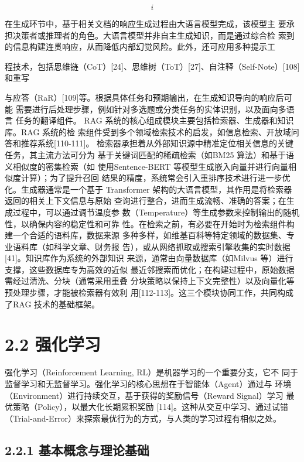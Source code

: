 \documentclass[12pt,a4paper,openright,UTF8]{ctexbook}
\begin{document}
\begin{equation*}
i
\end{equation*}

在生成环节中，基于相关文档的响应生成过程由大语言模型完成，该模型主 要承担决策者或推理者的角色。大语言模型并非自主生成知识，而是通过综合检 索到的信息构建连贯响应，从而降低内部幻觉风险。此外，还可应用多种提示工

程技术，包括思维链（CoT）[24]、思维树（ToT）[27]、自注释（Self-Note）[108]和重写

与应答（RaR）[109]等。根据具体任务和预期输出，在生成知识导向的响应后可能 需要进行后处理步骤，例如针对多选题或分类任务的实体识别，以及面向多语言 任务的翻译组件。 RAG 系统的核心组成模块主要包括检索器、生成器和知识库。RAG 系统的检 索组件受到多个领域检索技术的启发，如信息检索、开放域问答和推荐系统[110-111]。 检索器承担着从外部知识源中精准定位相关信息的关键任务，其主流方法可分为 基于关键词匹配的稀疏检索（如BM25 算法）和基于语义相似度的密集检索（如 使用Sentence-BERT 等模型生成嵌入向量并进行向量相似度计算）；为了提升召回 结果的精度，系统常会引入重排序技术进行进一步优化。生成器通常是一个基于 Transformer 架构的大语言模型，其作用是将检索器返回的相关上下文信息与原始 查询进行整合，进而生成流畅、准确的答案；在生成过程中，可以通过调节温度参 数（Temperature）等生成参数来控制输出的随机性，以确保内容的稳定性和可靠 性。在检索之前，有必要在开始时为检索组件构建一个合适的语料库，数据来源 多种多样，如维基百科等特定领域的数据集、专业语料库（如科学文章、财务报 告），或从网络抓取或搜索引擎收集的实时数据[41]。知识库作为系统的外部知识 来源，通常由向量数据库（如Milvus 等）进行支撑，这些数据库专为高效的近似 最近邻搜索而优化；在构建过程中，原始数据需经过清洗、分块（通常采用重叠 分块策略以保持上下文完整性）以及向量化等预处理步骤，才能被检索器有效利 用[112-113]。这三个模块协同工作，共同构成了RAG 技术的基础框架。

\section{2.2 强化学习}

强化学习（Reinforcement Learning, RL）是机器学习的一个重要分支，它不 同于监督学习和无监督学习。强化学习的核心思想在于智能体（Agent）通过与 环境（Environment）进行持续交互，基于获得的奖励信号（Reward Signal）学习 最优策略（Policy），以最大化长期累积奖励 [114]。这种从交互中学习、通过试错 （Trial-and-Error）来探索最优行为的方式，与人类的学习过程有相似之处。

\subsection{2.2.1 基本概念与理论基础}
\end{document}
